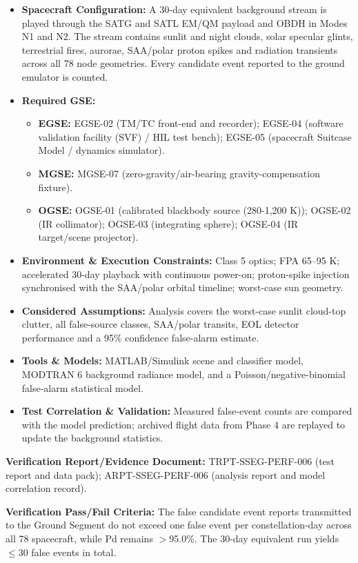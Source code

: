 \begin{itemize}
\item \textbf{Spacecraft Configuration:} A 30-day equivalent background stream is played through the SATG and SATL EM/QM payload and OBDH in Modes N1 and N2. The stream contains sunlit and night clouds, solar specular glints, terrestrial fires, aurorae, SAA/polar proton spikes and radiation transients across all 78 node geometries. Every candidate event reported to the ground emulator is counted.
\item \textbf{Required GSE:}
\begin{itemize}
\item \textbf{EGSE:} EGSE-02 (TM/TC front-end and recorder); EGSE-04 (software validation facility (SVF) / HIL test bench); EGSE-05 (spacecraft Suitcase Model / dynamics simulator).
\item \textbf{MGSE:} MGSE-07 (zero-gravity/air-bearing gravity-compensation fixture).
\item \textbf{OGSE:} OGSE-01 (calibrated blackbody source (280-1,200 K)); OGSE-02 (IR collimator); OGSE-03 (integrating sphere); OGSE-04 (IR target/scene projector).
\end{itemize}
\item \textbf{Environment \& Execution Constraints:} Class 5 optics; FPA 65--95 K; accelerated 30-day playback with continuous power-on; proton-spike injection synchronised with the SAA/polar orbital timeline; worst-case sun geometry.
\item \textbf{Considered Assumptions:} Analysis covers the worst-case sunlit cloud-top clutter, all false-source classes, SAA/polar transits, EOL detector performance and a 95\% confidence false-alarm estimate.
\item \textbf{Tools \& Models:} MATLAB/Simulink scene and classifier model, MODTRAN 6 background radiance model, and a Poisson/negative-binomial false-alarm statistical model.
\item \textbf{Test Correlation \& Validation:} Measured false-event counts are compared with the model prediction; archived flight data from Phase 4 are replayed to update the background statistics.
\end{itemize}
\par\textbf{Verification Report/Evidence Document:} TRPT-SSEG-PERF-006 (test report and data pack); ARPT-SSEG-PERF-006 (analysis report and model correlation record).
\par\textbf{Verification Pass/Fail Criteria:} The false candidate event reports transmitted to the Ground Segment do not exceed one false event per constellation-day across all 78 spacecraft, while Pd remains $>$95.0\%. The 30-day equivalent run yields $\le$30 false events in total.
\par\medskip
